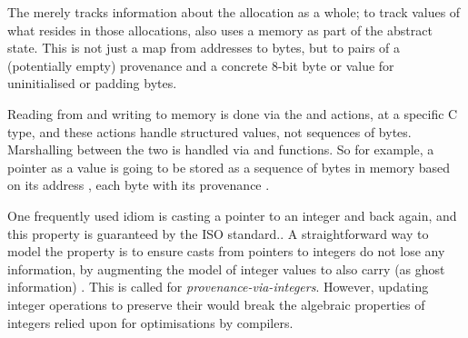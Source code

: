 The  merely tracks information about the allocation as a
whole; to track values of what resides in those allocations, 
also uses a memory  as part of the abstract state. This is not just a map
from addresses to bytes, but to pairs of a (potentially empty) provenance and a
concrete 8-bit byte or  value for uninitialised or padding
bytes.\label{sn:ignore-ptr-index}

Reading from and writing to memory is done via the  and
 actions, at a specific C type, and these actions handle
structured  values, not sequences of bytes. Marshalling between the
two is handled via  and  functions. So for
example, a pointer  as a value is going to be stored as a sequence of
bytes in memory based on its address , each byte with its provenance
.

One frequently used idiom is casting a pointer to
an integer and back again, and this  property is
guaranteed by the ISO standard.. A
straightforward way to model the  property is to ensure casts from
pointers to integers do not lose any information, by augmenting the model of
integer values to also carry (as ghost information) . This is called
 for \emph{provenance-via-integers}. However, updating
integer operations to preserve their  would break the algebraic
properties of integers relied upon for optimisations by compilers.

